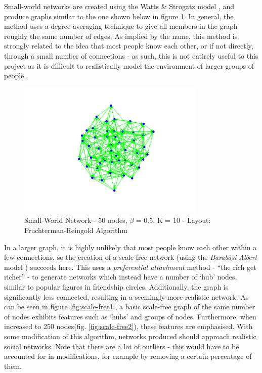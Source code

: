 \documentclass[]{article}
\begin{document}
Small-world networks are created using the Watts \& Strogatz model \cite{WSTech}, and produce graphs similar to the one shown below in figure \ref{fig:small-world}. In general, the method uses a degree averaging technique to give all members in the graph roughly the same number of edges. As implied by the name, this method is strongly related to the idea that most people know each other, or if not directly, through a small number of connections - as such, this is not entirely useful to this project as it is difficult to realistically model the environment of larger groups of people. 

\begin{figure}
	\centering
		\includegraphics[width=0.80\textwidth]{small-world.png}
	\caption{Small-World Network - 50 nodes, $\beta$ = 0.5, K = 10 - Layout: Fruchterman-Reingold Algorithm}
	\label{fig:small-world}
\end{figure}


In a larger graph, it is highly unlikely that most people know each other within a few connections, so the creation of a scale-free network (using the \emph{Barab\'{a}si}-\emph{Albert} model \cite{BAMod}) succeeds here. This uses a \emph{preferential attachment} method - ``the rich get richer'' - to generate networks which instead have a number of `hub' nodes, similar to popular figures in friendship circles. Additionally, the graph is significantly less connected, resulting in a seemingly more realistic network. As can be seen in figure \ref{fig:scale-free1}, a basic scale-free graph of the same number of nodes exhibits features such as `hubs' and groups of nodes. Furthermore, when increased to 250 nodes(fig. \ref{fig:scale-free2}), these features are emphasised. With some modification of this algorithm, networks produced should approach realistic social networks. Note that there are a lot of outliers - this would have to be accounted for in modifications, for example by removing a certain percentage of them.
\end{document}
